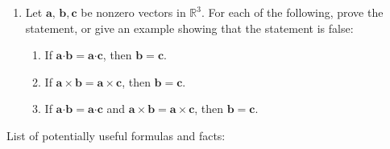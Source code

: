 \documentclass[12pt]{article}
\newcommand{\points}[1]{\marginpar{\hspace{24pt}[#1]}}
\newcommand{\R}{\mathbb{R}}
\newcommand{\aaa}{\mathbf{a}}
\newcommand{\bbb}{\mathbf{b}}
\newcommand{\ccc}{\mathbf{c}}
\newcommand{\dotp}{\boldsymbol{\cdot}}
\begin{document}
\begin{enumerate}
\vspace{3in}





\item Let $\mathbf{a},\,\mathbf{b},\mathbf{c}$ be nonzero vectors in $\R^3$. For each of the following, prove the statement, or give an example showing that the statement is false: \points{6}
\begin{enumerate}
\item If $\aaa\dotp\bbb = \aaa\dotp\ccc$, then $\bbb=\ccc$.
\item If $\aaa\times\bbb = \aaa\times\ccc$, then $\bbb=\ccc$.
\item If $\aaa\dotp\bbb = \aaa\dotp\ccc$ and $\aaa\times\bbb = \aaa\times\ccc$, then $\bbb=\ccc$.

\end{enumerate}

\end{enumerate}
\newpage

\begin{center}
List of potentially useful formulas and facts:
\end{center}
\end{document}
